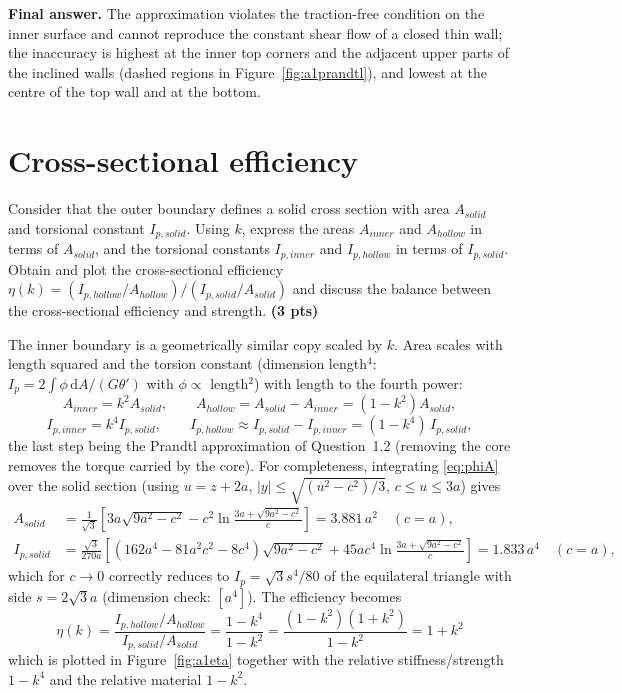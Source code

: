 \bigskip
\noindent\textbf{Final answer.} The approximation violates the traction-free condition on the inner surface and cannot reproduce the constant shear flow of a closed thin wall; the inaccuracy is highest at the inner top corners and the adjacent upper parts of the inclined walls (dashed regions in Figure~\ref{fig:a1prandtl}), and lowest at the centre of the top wall and at the bottom.

\section{Cross-sectional efficiency}

Consider that the outer boundary defines a solid cross section with area $A_{solid}$ and torsional constant $I_{p,solid}$. Using $k$, express the areas $A_{inner}$ and $A_{hollow}$ in terms of $A_{solid}$, and the torsional constants $I_{p,inner}$ and $I_{p,hollow}$ in terms of $I_{p,solid}$. Obtain and plot the cross-sectional efficiency
$\eta(k) = (I_{p,hollow}/A_{hollow})/(I_{p,solid}/A_{solid})$ and discuss the balance between the cross-sectional efficiency and strength. \textbf{(3 pts)}

\bigskip
The inner boundary is a geometrically similar copy scaled by $k$. Area scales with length squared and the torsion constant (dimension length$^4$: $I_p=2\!\int\!\phi\,\mathrm{d}A/(G\theta')$ with $\phi\propto$ length$^2$) with length to the fourth power:
\begin{equation}
  A_{inner}=k^2A_{solid},\qquad A_{hollow}=A_{solid}-A_{inner}=(1-k^2)A_{solid},
\end{equation}
\begin{equation}
  I_{p,inner}=k^4I_{p,solid},\qquad I_{p,hollow}\approx I_{p,solid}-I_{p,inner}=(1-k^4)\,I_{p,solid},
\end{equation}
the last step being the Prandtl approximation of Question~1.2 (removing the core removes the torque carried by the core). For completeness, integrating \eqref{eq:phiA} over the solid section (using $u=z+2a$, $|y|\le\sqrt{(u^2-c^2)/3}$, $c\le u\le3a$) gives
\begin{align}
  A_{solid}&=\frac{1}{\sqrt3}\left[3a\sqrt{9a^2-c^2}-c^2\ln\frac{3a+\sqrt{9a^2-c^2}}{c}\right] = 3.881\,a^2 \quad(c=a),\\
  I_{p,solid}&=\frac{\sqrt3}{270a}\left[\left(162a^4-81a^2c^2-8c^4\right)\sqrt{9a^2-c^2}+45ac^4\ln\frac{3a+\sqrt{9a^2-c^2}}{c}\right]=1.833\,a^4\quad(c=a),
\end{align}
which for $c\to0$ correctly reduces to $I_p=\sqrt3 s^4/80$ of the equilateral triangle with side $s=2\sqrt3a$ (dimension check: $[a^4]$). The efficiency becomes
\begin{equation}
  \boxed{\;\eta(k)=\frac{I_{p,hollow}/A_{hollow}}{I_{p,solid}/A_{solid}}=\frac{1-k^4}{1-k^2}=\frac{(1-k^2)(1+k^2)}{1-k^2}=1+k^2\;}
\end{equation}
which is plotted in Figure~\ref{fig:a1eta} together with the relative stiffness/strength $1-k^4$ and the relative material $1-k^2$.

